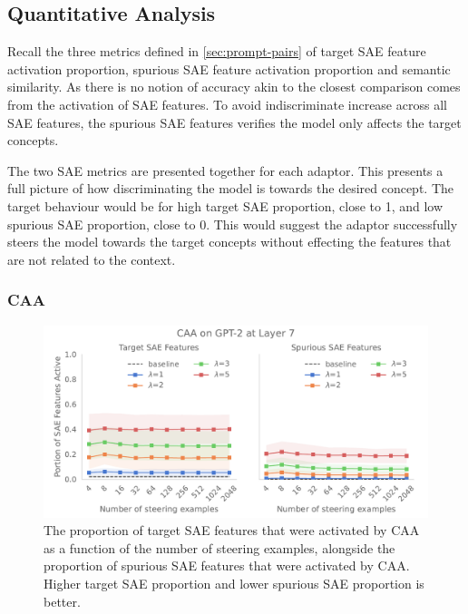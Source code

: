 \subsection{Quantitative Analysis}
\label{sec:quant}

Recall the three metrics defined in \cref{sec:prompt-pairs} of target SAE feature activation proportion, spurious SAE feature activation proportion and semantic similarity.
As there is no notion of accuracy akin to \citet{steering-clear} the closest comparison comes from the activation of SAE features.
To avoid indiscriminate increase across all SAE features, the spurious SAE features verifies the model only affects the target concepts.

The two SAE metrics are presented together for each adaptor.
This presents a full picture of how discriminating the model is towards the desired concept.
The target behaviour would be for high target SAE proportion, close to 1, and low spurious SAE proportion, close to 0.
This would suggest the adaptor successfully steers the model towards the target concepts without effecting the features that are not related to the context.

\subsubsection{CAA}

\begin{figure}
    \centering
    \captionsetup{width=.9\textwidth}
    \includegraphics[width=\textwidth]{figures/gpt2_7_caa.pdf}
    \caption{
        The proportion of target SAE features that were activated by CAA as a function of the number of steering examples, alongside the proportion of spurious SAE features that were activated by CAA.
        Higher target SAE proportion and lower spurious SAE proportion is better.
    }
    \label{fig:gpt-caa}
\end{figure}

